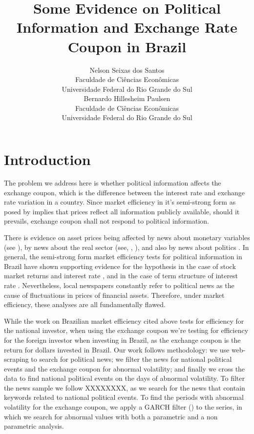 \documentclass[a4paper]{article}
\title{Some Evidence on Political Information and Exchange Rate Coupon in Brazil}
\author{Nelson Seixas dos Santos\\Faculdade de Ciências Econômicas\\Universidade Federal do Rio Grande do Sul\\Bernardo Hillesheim Paulsen\\Faculdade de Ciências Econômicas\\Universidade Federal do Rio Grande do Sul}
\begin{document}
\maketitle
\clearpage
\tableofcontents
\clearpage
\listoffigures
\clearpage
\listoftables
\clearpage

\begin{abstract}

\end{abstract}


\section{Introduction}

The problem we address here is whether political information affects the exchange coupon, which is the difference between the interest rate and exchange rate variation in a country. Since market efficiency in it's semi-strong form as posed by  \citet{fama1970} implies that prices reflect all information publicly available, should it prevails, exchange coupon shall not respond to political information. 

There is evidence on asset prices being affected by news about monetary variables (see \citet{cornell1983}), by news about the real sector (see, \citet{mcqueenroley1993}, \citet{caporaleetal2015}), and also by news about politics \citet{marquessantos2016}. In general, the semi-strong form market efficiency tests for political information in Brazil have shown supporting evidence for the hypothesis in the case of stock market returns and interest rate \citet{marquessantos2016}, and in the case of term structure of interest rate \citet{santos2018}. Nevertheless, local newspapers constantly refer to political news as the cause of fluctuations in prices of financial assets. Therefore, under market efficiency, these analyses are all fundamentally flawed.

While the work on Brazilian market efficiency cited above tests for efficiency for the national investor, when using the exchange coupon we're testing for efficiency for the foreign investor when investing in Brazil, as the exchange coupon is the return for dollars invested in Brazil. Our work follows \citet{marquessantos2016} methodology: we use web-scraping to search for political news; we filter the news for national political events and the exchange coupon for abnormal volatility; and finally we cross the data to find national political events on the days of abnormal volatility. To filter the news sample we follow XXXXXXXX, as we search for the news that contain keywords related to national political events. To find the periods with abnormal volatility for the exchange coupon, we apply a GARCH filter (\citet{bollerslev1986}) to the series, in which we search for abnormal values with both a parametric and a non parametric analysis.
\end{document}
